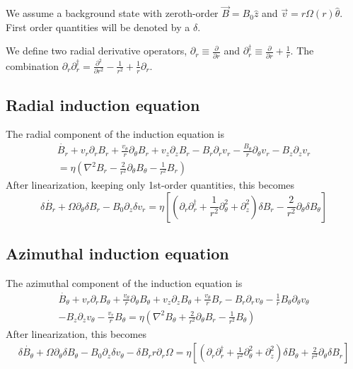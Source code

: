 \documentclass[letterpaper]{article}
\begin{document}
We assume a background state with zeroth-order $\vec{B}=B_0
\hat{z}$ and $\vec{ v}=r\Omega(r)\hat{\theta}$.  First order
quantities will be denoted by a $\delta$.

We define two radial derivative operators, $\partial_r \equiv
\frac{\partial}{\partial r}$ and $\partial_{r}^\dagger \equiv
\frac{\partial}{\partial r}+\frac{1}{r}$.  The combination $\partial_r
\partial_r^\dagger = \frac{\partial^2}{\partial
  r^2}-\frac{1}{r^2}+\frac{1}{r}\partial_r$.

\subsection{Radial induction equation}

The radial component of the induction equation is
\begin{align}
\dot{B_r} + v_r \partial_r B_r + \frac{v_\theta}{r}\partial_\theta B_r
 + v_z \partial_z B_r - B_r \partial_r v_r
 -\frac{B_\theta}{r}\partial_\theta v_r - B_z \partial_z v_r
\nonumber \\
= \eta\left(\nabla^2 B_r -\frac{2}{r^2}\partial_\theta B_\theta
 - \frac{1}{r^2}B_r\right)
\end{align}
After linearization, keeping only 1st-order quantities, this becomes
\begin{equation}
\delta \dot{B_r} + \Omega \partial_\theta \delta B_r
 - B_0 \partial_z \delta v_r = \eta\left[\left(\partial_r \partial_r^\dagger
 + \frac{1}{r^2}\partial_\theta^2 + \partial_z^2\right)\delta B_r
 - \frac{2}{r^2}\partial_\theta \delta B_\theta\right]
\end{equation}

\subsection{Azimuthal induction equation}
The azimuthal component of the induction equation is
\begin{align}
\dot{B_\theta}+v_r \partial_r B_\theta
 + \frac{v_\theta}{r}\partial_\theta B_\theta + v_z \partial_z B_\theta
 + \frac{v_\theta}{r}B_r - B_r\partial_r v_\theta
 - \frac{1}{r}B_\theta \partial_\theta v_\theta
\nonumber \\
- B_z \partial_z v_\theta - \frac{v_r}{r}B_\theta
 = \eta\left(\nabla^2 B_\theta + \frac{2}{r^2}\partial_\theta B_r
 - \frac{1}{r^2}B_\theta \right)
\end{align}
After linearization, this becomes
\begin{align}
\delta \dot{B_\theta} + \Omega \partial_\theta \delta B_\theta
 - B_0 \partial_z \delta v_\theta - \delta B_r r \partial_r \Omega
 = \eta\left[\left(\partial_r \partial_r^\dagger
 + \frac{1}{r^2}\partial_\theta^2 + \partial_z^2\right)\delta B_\theta
 + \frac{2}{r^2}\partial_\theta \delta B_r\right]
\end{align}
\end{document}
